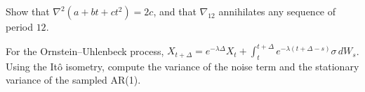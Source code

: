 \begin{notechapter}
\begin{exercise}\label{linear-time-series:exr:4}
Show that $\nabla^2(a + bt + ct^2) = 2c$, and that $\nabla_{12}$ annihilates any sequence of period $12$.
\end{exercise}

\begin{exercise}\label{linear-time-series:exr:5}
For the Ornstein--Uhlenbeck process, $X_{t+\Delta} = e^{-\lambda\Delta}X_t + \int_t^{t+\Delta}e^{-\lambda(t+\Delta-s)}\sigma\,dW_s$. Using the Itô isometry,
compute the variance of the noise term and the stationary variance of the sampled AR(1).
\end{exercise}
\end{notechapter}
